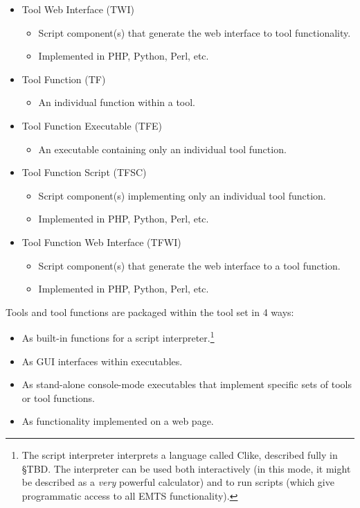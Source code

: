 \begin{itemize}
   \item Tool Web Interface (TWI)
      \begin{itemize}
         \item Script component(s) that generate the web interface to tool functionality.
         \item Implemented in PHP, Python, Perl, etc.
      \end{itemize}
   \item Tool Function (TF)
      \begin{itemize}
         \item An individual function within a tool.
      \end{itemize}
   \item Tool Function Executable (TFE)
      \begin{itemize}
         \item An executable containing only an individual tool function.
      \end{itemize}
   \item Tool Function Script (TFSC)
      \begin{itemize}
         \item Script component(s) implementing only an individual tool function.
         \item Implemented in PHP, Python, Perl, etc.
      \end{itemize}
   \item Tool Function Web Interface (TFWI)
      \begin{itemize}
         \item Script component(s) that generate the web interface to a tool function.
         \item Implemented in PHP, Python, Perl, etc.
      \end{itemize}
\end{itemize}

Tools and tool functions are packaged within the tool set in 4 ways:

\begin{itemize}
   \item As built-in functions for a script interpreter.\footnote{The script interpreter
         interprets a language called Clike, described fully in \S{}TBD.  The interpreter
         can be used both interactively (in this mode, it might be described as a
         \emph{very} powerful calculator) and to run scripts (which give programmatic access
         to all EMTS functionality).}
   \item As GUI interfaces within executables.
   \item As stand-alone console-mode executables that implement specific sets of tools or
         tool functions.
   \item As functionality implemented on a web page.
\end{itemize}

